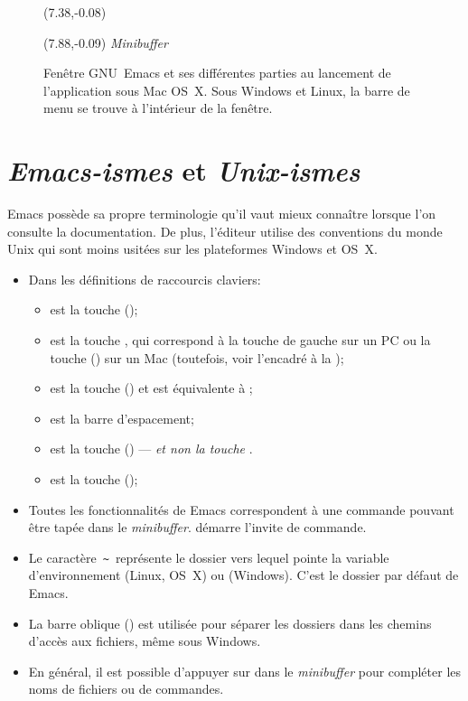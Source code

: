 \begin{figure}[t]
  \begin{textblock}{0.35}(7.38,-0.08)
    \Large\faLongArrowRight
  \end{textblock}
  \begin{textblock}{1.75}(7.88,-0.09)
    \footnotesize\sffamily \emph{Minibuffer}
  \end{textblock}
  \caption{Fenêtre GNU~Emacs et ses différentes parties au lancement
    de l'application sous Mac OS~X. Sous Windows et Linux, la barre de
    menu se trouve à l'intérieur de la fenêtre.}
  \label{fig:ess:emacswindow}
\end{figure}


\section{\emph{Emacs-ismes} et \emph{Unix-ismes}}
\label{emacs+ess:ismes}

Emacs possède sa propre terminologie qu'il vaut mieux connaître
lorsque l'on consulte la documentation. De plus, l'éditeur utilise des
conventions du monde Unix qui sont moins usitées sur les plateformes
Windows et OS~X.

\begin{itemize}
\item Dans les définitions de raccourcis claviers:
  \begin{itemize}
  \item {} est la touche  (\ctlkey);
  \item {} est la touche , qui correspond à la touche
     de gauche sur un PC ou la touche 
    (\optkey) sur un Mac (toutefois, voir l'encadré à la
    );
  \item {} est la touche  (\esckey) et
    est équivalente à ;
  \item {} est la barre d'espacement;
  \item {} est la touche  (\delkey) ---
    \emph{et non la touche} .
  \item {} est la touche  (\returnkey);
  \end{itemize}
\item Toutes les fonctionnalités de Emacs correspondent à une commande
  pouvant être tapée dans le \emph{minibuffer}.  démarre
  l'invite de commande.
\item Le caractère \,\verb=~=\, représente le dossier vers lequel
  pointe la variable d'environnement  (Linux, OS~X) ou
   (Windows). C'est le dossier par défaut de Emacs.
\item La barre oblique (\code{/}) est utilisée pour séparer les
  dossiers dans les chemins d'accès aux fichiers, même sous Windows.
\item En général, il est possible d'appuyer sur  dans le
  \emph{minibuffer} pour compléter les noms de fichiers ou de
  commandes.
\end{itemize}

